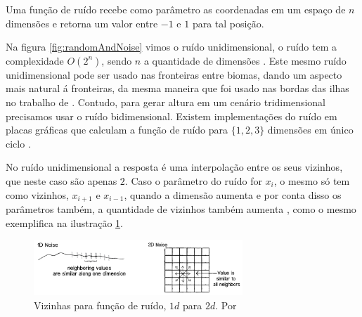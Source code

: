 Uma função de ruído recebe como parâmetro as coordenadas em um espaço de $n$ dimensões e
retorna um valor entre $-1$ e $1$ para tal posição\cite{shiffman2012nature}.

Na figura \ref{fig:randomAndNoise} vimos o ruído unidimensional, o ruído
tem a complexidade $O(2^n)$, sendo $n$ a quantidade de dimensões \cite{zucker2001perlin}.
Este mesmo ruído unidimensional pode ser usado nas fronteiras entre biomas, dando
um aspecto mais natural á fronteiras, da mesma maneira que foi usado nas bordas
das ilhas no trabalho de \cite{patel2010polygonal}. Contudo, para gerar altura
em um cenário tridimensional precisamos usar o ruído bidimensional. Existem
implementações do ruído em placas gráficas que calculam a função de ruído para 
$\{1, 2, 3\}$ dimensões em único ciclo \cite{perlin2002improving}.

No ruído unidimensional a resposta é uma interpolação entre os seus vizinhos, que
neste caso são apenas $2$. Caso o parâmetro do ruído for $x_{i}$, o mesmo só tem 
como vizinhos, $x_{i+1}$ e $x_{i-1}$, quando a dimensão aumenta e por conta disso
os parâmetros também, a quantidade de vizinhos também aumenta \cite{shiffman2012nature}, 
como o mesmo exemplifica na ilustração \ref{fig:1dto2dnoise}.
\begin{figure}[H]
    \centering
    \includegraphics[width=0.7\textwidth]{figuras/1dto2dnoise.png}
    \caption{Vizinhas para função de ruído, $1d$ para $2d$. Por \cite{shiffman2012nature}}
    \label{fig:1dto2dnoise}
\end{figure}

